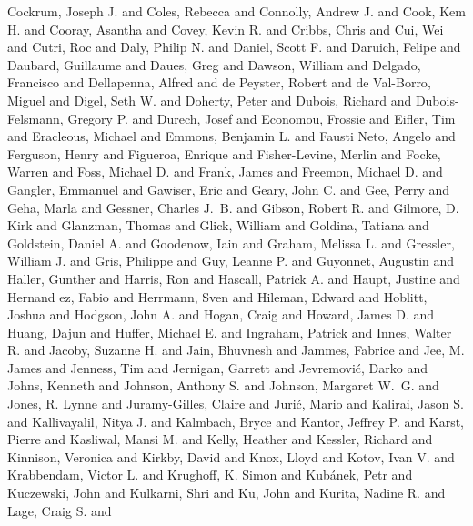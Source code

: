 {{         {Cockrum}, Joseph J. and {Coles}, Rebecca and {Connolly}, Andrew J. and
         {Cook}, Kem H. and {Cooray}, Asantha and {Covey}, Kevin R. and
         {Cribbs}, Chris and {Cui}, Wei and {Cutri}, Roc and {Daly}, Philip N. and
         {Daniel}, Scott F. and {Daruich}, Felipe and {Daubard}, Guillaume and
         {Daues}, Greg and {Dawson}, William and {Delgado}, Francisco and
         {Dellapenna}, Alfred and {de Peyster}, Robert and
         {de Val-Borro}, Miguel and {Digel}, Seth W. and {Doherty}, Peter and
         {Dubois}, Richard and {Dubois-Felsmann}, Gregory P. and
         {Durech}, Josef and {Economou}, Frossie and {Eifler}, Tim and
         {Eracleous}, Michael and {Emmons}, Benjamin L. and
         {Fausti Neto}, Angelo and {Ferguson}, Henry and {Figueroa}, Enrique and
         {Fisher-Levine}, Merlin and {Focke}, Warren and {Foss}, Michael D. and
         {Frank}, James and {Freemon}, Michael D. and {Gangler}, Emmanuel and
         {Gawiser}, Eric and {Geary}, John C. and {Gee}, Perry and
         {Geha}, Marla and {Gessner}, Charles J.~B. and {Gibson}, Robert R. and
         {Gilmore}, D. Kirk and {Glanzman}, Thomas and {Glick}, William and
         {Goldina}, Tatiana and {Goldstein}, Daniel A. and {Goodenow}, Iain and
         {Graham}, Melissa L. and {Gressler}, William J. and {Gris}, Philippe and
         {Guy}, Leanne P. and {Guyonnet}, Augustin and {Haller}, Gunther and
         {Harris}, Ron and {Hascall}, Patrick A. and {Haupt}, Justine and {Hernand
        ez}, Fabio and {Herrmann}, Sven and {Hileman}, Edward and
         {Hoblitt}, Joshua and {Hodgson}, John A. and {Hogan}, Craig and
         {Howard}, James D. and {Huang}, Dajun and {Huffer}, Michael E. and
         {Ingraham}, Patrick and {Innes}, Walter R. and {Jacoby}, Suzanne H. and
         {Jain}, Bhuvnesh and {Jammes}, Fabrice and {Jee}, M. James and
         {Jenness}, Tim and {Jernigan}, Garrett and {Jevremovi{\'c}}, Darko and
         {Johns}, Kenneth and {Johnson}, Anthony S. and
         {Johnson}, Margaret W.~G. and {Jones}, R. Lynne and
         {Juramy-Gilles}, Claire and {Juri{\'c}}, Mario and {Kalirai}, Jason S. and
         {Kallivayalil}, Nitya J. and {Kalmbach}, Bryce and
         {Kantor}, Jeffrey P. and {Karst}, Pierre and {Kasliwal}, Mansi M. and
         {Kelly}, Heather and {Kessler}, Richard and {Kinnison}, Veronica and
         {Kirkby}, David and {Knox}, Lloyd and {Kotov}, Ivan V. and
         {Krabbendam}, Victor L. and {Krughoff}, K. Simon and
         {Kub{\'a}nek}, Petr and {Kuczewski}, John and {Kulkarni}, Shri and
         {Ku}, John and {Kurita}, Nadine R. and {Lage}, Craig S. and
}}
